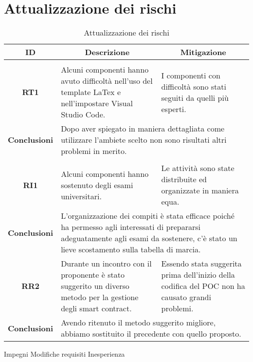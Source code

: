 \appendix

\section{Attualizzazione dei rischi} \label{section:attualizzazione_dei_rischi}
\begin{table}[H]
  \centering
  \renewcommand{\arraystretch}{1.8}
  \begin{tabular}{c|p{6cm}|p{6cm}}
    \rowcolor[HTML]{125E28}
    \color[HTML]{FFFFFF}\textbf{ID}
    & \multicolumn{1}{c}{\color[HTML]{FFFFFF}\textbf{Descrizione}}
    & \multicolumn{1}{c}{\color[HTML]{FFFFFF}\textbf{Mitigazione}}\\
    \hline
    \rowcolor[HTML]{6BC26B}
    \multicolumn{3}{c}{\textbf{Analisi preliminare}}\\
    \hline
    \textbf{RT1} & Alcuni componenti hanno avuto difficoltà nell'uso del template LaTex e nell'impostare Visual Studio Code. & I componenti con difficoltà sono stati seguiti da quelli più esperti.\\
    \textbf{Conclusioni} & \multicolumn{2}{l}{Dopo aver spiegato in maniera dettagliata come utilizzare l'ambiete scelto non sono risultati altri problemi in merito.}\\
    \hline
    \rowcolor[HTML]{6BC26B}
    \multicolumn{3}{c}{\textbf{Progettazione della Technology Baseline}}\\
    \hline
    \textbf{RI1} & Alcuni componenti hanno sostenuto degli esami universitari. & Le attività sono state distribuite ed organizzate in maniera equa.\\
    \textbf{Conclusioni} & \multicolumn{2}{l}{L'organizzazione dei compiti è stata efficace poiché ha permesso agli interessati di prepararsi adeguatamente agli esami da sostenere, c'è stato un lieve scostamento sulla tabella di marcia.}\\
    \hline
    \textbf{RR2} & Durante un incontro con il proponente è stato suggerito un diverso metodo per la gestione degli smart contract. & Essendo stata suggerita prima dell'inizio della codifica del POC non ha causato grandi problemi.\\
    \textbf{Conclusioni} & \multicolumn{2}{l}{Avendo ritenuto il metodo suggerito migliore, abbiamo sostituito il precedente con quello proposto.}\\
  \end{tabular}
  \caption{Attualizzazione dei rischi}
\end{table}
Impegni
Modifiche requisiti
Inesperienza